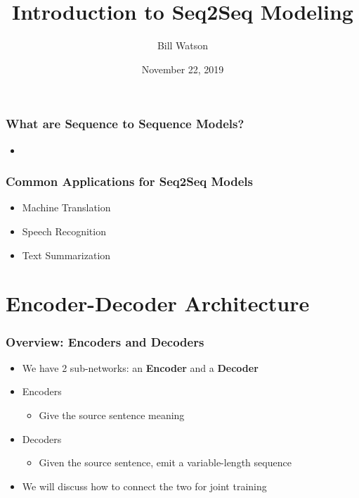 \documentclass{beamer}
\title{Introduction to Seq2Seq Modeling}
\author{Bill Watson}
\institute{S\&P Global}
\date{November 22, 2019}
\begin{document}
\begin{frame}
\titlepage
\end{frame}


\begin{frame}
\frametitle{What are Sequence to Sequence Models?}
\begin{itemize}
  \item
\end{itemize}
\end{frame}

\begin{frame}
\frametitle{Common Applications for Seq2Seq Models}
\begin{itemize}
  \item Machine Translation
  \item Speech Recognition
  \item Text Summarization
\end{itemize}
\end{frame}

\section{Encoder-Decoder Architecture}

\begin{frame}
\frametitle{Overview: Encoders and Decoders}
\begin{itemize}
  \item We have 2 sub-networks: an \textbf{Encoder} and a \textbf{Decoder}
  \item Encoders
  \begin{itemize}
    \item Give the source sentence meaning
  \end{itemize}
  \item Decoders
  \begin{itemize}
    \item Given the source sentence, emit a variable-length sequence
  \end{itemize}
  \item We will discuss how to connect the two for joint training
\end{itemize}
\end{frame}
\end{document}
